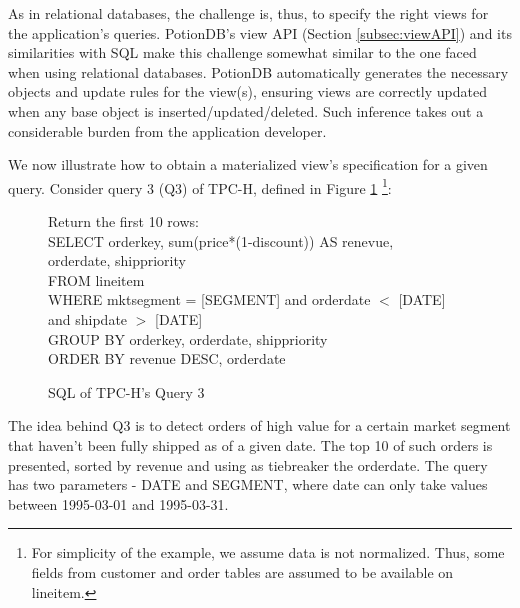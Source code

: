 \documentclass{vldb}
\begin{document}
As in relational databases, the challenge is, thus, to specify the right views for the application's queries.
PotionDB's view API (Section \ref{subsec:viewAPI}) and its similarities with SQL make this challenge somewhat similar to the one faced when using relational databases.
PotionDB automatically generates the necessary objects and update rules for the view(s), ensuring views are correctly updated when any base object is inserted/updated/deleted.
Such inference takes out a considerable burden from the application developer.

We now illustrate how to obtain a materialized view’s specification for a given query. 
Consider query 3 (Q3) of TPC-H, defined in Figure \ref{fig:q3}
\footnote{For simplicity of the example, we assume data is not normalized. Thus, some fields from customer and order tables are assumed to be available on lineitem.}:

\begin{figure}[h]
	Return the first 10 rows: \\
	SELECT orderkey, sum(price*(1-discount)) AS renevue, \\
	\hphantom{SELECT }orderdate, shippriority \\
	FROM lineitem \\
	WHERE mktsegment = [SEGMENT] and orderdate $<$ [DATE] and shipdate $>$ [DATE]\\
	GROUP BY orderkey, orderdate, shippriority \\
	ORDER BY revenue DESC, orderdate \\
\caption{SQL of TPC-H's Query 3}
\label{fig:q3}
\end{figure}


The idea behind Q3 is to detect orders of high value for a certain market segment that haven't been fully shipped as of a given date.
The top 10 of such orders is presented, sorted by revenue and using as tiebreaker the orderdate.
The query has two parameters - DATE and SEGMENT, where date can only take values between 1995-03-01 and 1995-03-31.
\end{document}
